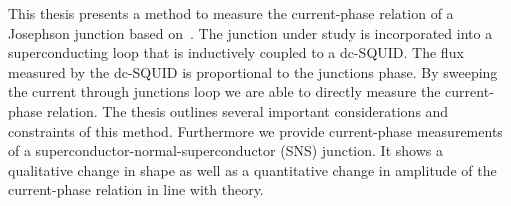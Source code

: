 This thesis presents a method to measure the current-phase relation of a Josephson junction based on~\cite{frolovMeasurementCurrentPhaseRelation2004}. The junction under study is incorporated into a superconducting loop that is inductively coupled to a dc-SQUID. The flux measured by the dc-SQUID is proportional to the junctions phase. By sweeping the current through junctions loop we are able to directly measure the current-phase relation. The thesis outlines several important considerations and constraints of this method. Furthermore we provide current-phase measurements of a superconductor-normal-superconductor (SNS) junction. It shows a qualitative change in shape as well as a quantitative change in amplitude of the current-phase relation in line with theory.